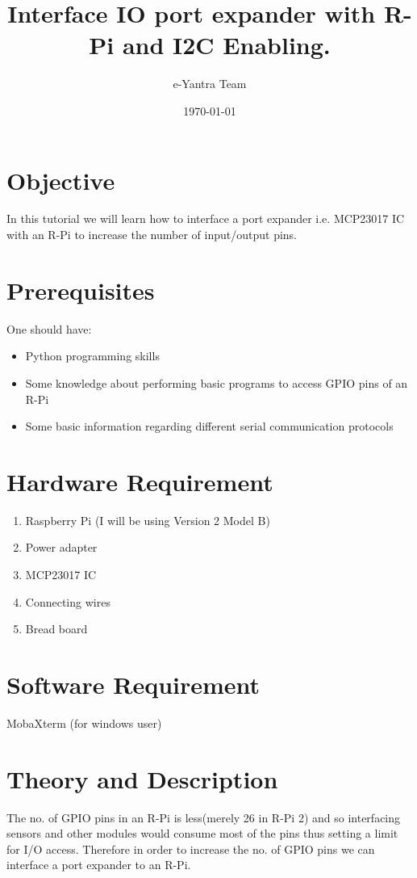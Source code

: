 \documentclass[11pt,a4paper]{article}
\title{Interface IO port expander with R-Pi and I2C Enabling.}
\author{e-Yantra Team}
\date{\today}
\begin{document}
	\maketitle
	\newpage
	\tableofcontents
	\newpage
	\section{Objective}
	In this tutorial we will learn how to interface a port expander i.e. MCP23017 IC with an R-Pi to increase the number of input/output pins.
	\section{Prerequisites}
	One should have:
	\begin{itemize}
		\item Python programming skills
		\item Some knowledge about performing basic programs to access GPIO pins of an R-Pi
		\item Some basic information regarding different serial communication \newline protocols
	\end{itemize}
	\section{Hardware Requirement}
	\begin{enumerate}
		\item Raspberry Pi (I will be using Version 2 Model B)
		\item Power adapter
		\item MCP23017 IC
		\item Connecting wires
		\item Bread board
	\end{enumerate}
	\section{Software Requirement}
	MobaXterm (for windows user) 
	
	\newpage
	\section{Theory and Description}
	The no. of GPIO pins in an R-Pi is less(merely 26 in R-Pi 2) and so interfacing sensors and other modules would consume most of the pins thus setting a limit for I/O access. Therefore in order to increase the no. of GPIO pins we can interface a port expander to an R-Pi.
	
\end{document}

